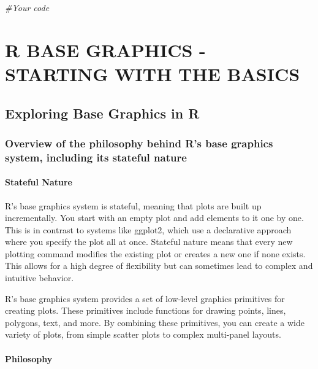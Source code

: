 \documentclass[
]{book}
\newenvironment{Shaded}{\begin{snugshade}}{\end{snugshade}}
\newcommand{\CommentTok}[1]{\textcolor[rgb]{0.56,0.35,0.01}{\textit{#1}}}
\begin{document}
\begin{Shaded}
\begin{Highlighting}[]
\CommentTok{\#Your code}
\end{Highlighting}
\end{Shaded}

\chapter{R BASE GRAPHICS - STARTING WITH THE BASICS}\label{r-base-graphics---starting-with-the-basics}

\section{Exploring Base Graphics in R}\label{exploring-base-graphics-in-r}

\subsection{Overview of the philosophy behind R's base graphics system, including its stateful nature}\label{overview-of-the-philosophy-behind-rs-base-graphics-system-including-its-stateful-nature}

\subsubsection{Stateful Nature}\label{stateful-nature}

R's base graphics system is stateful, meaning that plots are built up incrementally. You start with an empty plot and add elements to it one by one. This is in contrast to systems like ggplot2, which use a declarative approach where you specify the plot all at once.
Stateful nature means that every new plotting command modifies the existing plot or creates a new one if none exists. This allows for a high degree of flexibility but can sometimes lead to complex and intuitive behavior.

R's base graphics system provides a set of low-level graphics primitives for creating plots. These primitives include functions for drawing points, lines, polygons, text, and more.
By combining these primitives, you can create a wide variety of plots, from simple scatter plots to complex multi-panel layouts.

\subsubsection{Philosophy}\label{philosophy}
\end{document}
